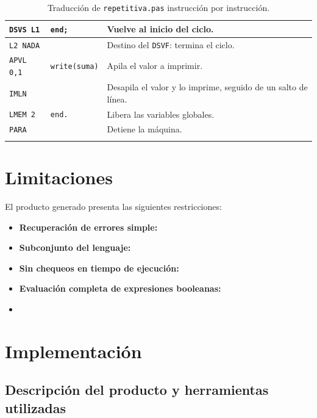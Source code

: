 \documentclass[12pt]{article}
\begin{document}
\begin{longtable}{|p{3.2cm}|p{5cm}|p{7cm}|}
\hline
\texttt{DSVS L1} & \texttt{end;} & Vuelve al inicio del ciclo. \\
\hline
\texttt{L2 NADA} & \texttt{} & Destino del \texttt{DSVF}: termina el ciclo. \\
\hline
\texttt{APVL 0,1} & \texttt{write(suma)} & Apila el valor a imprimir. \\
\hline
\texttt{IMLN} & \texttt{} & Desapila el valor y lo imprime, seguido de un salto de línea. \\
\hline
\texttt{LMEM 2} & \texttt{end.} & Libera las variables globales. \\
\hline
\texttt{PARA} & \texttt{} & Detiene la máquina. \\
\hline
\caption{Traducción de \texttt{repetitiva.pas} instrucción por instrucción.}
\label{tab:repetitiva}
\end{longtable}


\section{Limitaciones}
El producto generado presenta las siguientes restricciones:
\begin{itemize}
    \item \textbf{Recuperación de errores simple:} 
    \item \textbf{Subconjunto del lenguaje:} 
    \item \textbf{Sin chequeos en tiempo de ejecución:} 
    \item \textbf{Evaluación completa de expresiones booleanas:} 
    \item {}
\end{itemize}

\section{Implementación}

\subsection{Descripción del producto y herramientas utilizadas}
\end{document}
